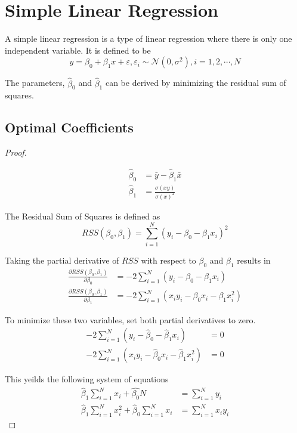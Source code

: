 \section{Simple Linear Regression}

A simple linear regression is a type of linear regression where there is only one independent variable.
It is defined to be
\[y=\beta_0+\beta_1x+\varepsilon,\varepsilon_i\sim\mathcal{N}(0,\sigma^2),i=1,2,\cdots,N\]

The parameters, $\hat{\beta}_0$ and $\hat{\beta}_1$ can be derived by minimizing the residual sum of squares.
\subsection{Optimal Coefficients}
\begin{proof}
\label{param}

\begin{align*}
\hat{\beta}_0   &= \bar{y}-\hat{\beta}_1\bar{x}\\
\hat{\beta}_1   &= \frac{\sigma(xy)}{\sigma(x)^2}
\end{align*}

The Residual Sum of Squares is defined as
\[RSS(\beta_0,\beta_1)=\sum_{i=1}^{N}(y_i-\beta_0-\beta_1x_i)^2\]

Taking the partial derivative of $RSS$ with respect to $\beta_0$ and $\beta_1$ results in
\begin{align*}
\frac{\partial RSS(\beta_0,\beta_1)}{\partial\beta_0}   &= -2\sum_{i=1}^{N}(y_i-\beta_0-\beta_1x_i) \\
\frac{\partial RSS(\beta_0,\beta_1)}{\partial\beta_1}   &= -2\sum_{i=1}^{N}(x_iy_i-\beta_0x_i-\beta_1x_i^2)
\end{align*}

To minimize these two variables, set both partial derivatives to zero.
\begin{align*}
-2\sum_{i=1}^{N}(y_i-\hat{\beta}_0-\hat{\beta}_1x_i)            &= 0 \\
-2\sum_{i=1}^{N}(x_iy_i-\hat{\beta}_0x_i-\hat{\beta}_1x_i^2)    &= 0
\end{align*}

This yeilds the following system of equations
\begin{align*}
\hat{\beta}_1\sum_{i=1}^{N}x_i+\hat{\beta_0}N &= \sum_{i=1}^{N}y_i\\
\hat{\beta}_1\sum_{i=1}^{N}x_i^2+\hat{\beta}_0\sum_{i=1}^{N}x_i &=\sum_{i=1}^{N}x_iy_i
\end{align*}


\end{proof}
